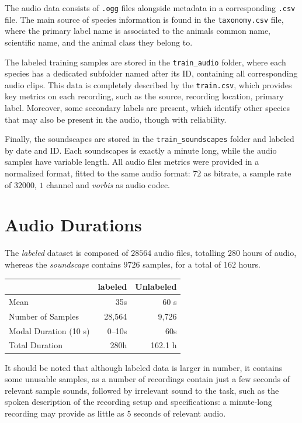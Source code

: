 \documentclass[11pt]{article}
\begin{document}
The audio data consists of \texttt{.ogg} files alongside metadata in a corresponding \texttt{.csv} file. The main source of species information is found in the \texttt{taxonomy.csv} file, where the primary label name is associated to the animals common name, scientific name, and the animal class they belong to.

The labeled training samples are stored in the \texttt{train\_audio} folder, where each species has a dedicated subfolder named after its ID, containing all corresponding audio clips. This data is completely described by the \texttt{train.csv}, which provides key metrics on each recording, such as the source, recording location, primary label. Moreover, some secondary labels are present, which identify other species that may also be present in the audio, though with reliability.

Finally, the soundscapes are stored in the \texttt{train\_soundscapes} folder and labeled by date and ID. Each soundscapes is exactly a minute long, while the audio samples have variable length. All audio files metrics were provided in a normalized format, fitted to the same audio format: $72$ as bitrate, a sample rate of $32000$, $1$ channel and \textit{vorbis} as audio codec.

\section*{Audio Durations}

The \textit{labeled} dataset is composed of $28564$ audio files, totalling $280$ hours of audio, whereas the \textit{soundscape} contains $9726$ samples, for a total of $162$ hours.

\begin{table}[h!]
  \centering
  \begin{tabular}{|l|r|r|}
    \hline
    & \textbf{labeled} & \textbf{Unlabeled} \\
    \hline
    Mean                  & 35s      & 60 s       \\
    Number of Samples      & 28,564   & 9,726      \\
    Modal Duration (10 s)  & 0--10s   & 60s        \\
    Total Duration         & 280h     & 162.1 h    \\
    \hline
  \end{tabular}
\end{table}

It should be noted that although labeled data is larger in number, it contains some unusable samples, as a number of recordings contain just a few seconds of relevant sample sounds, followed by irrelevant sound to the task, such as the spoken description of the recording setup and specifications: a minute-long recording may provide as little as 5 seconds of relevant audio.
\end{document}
